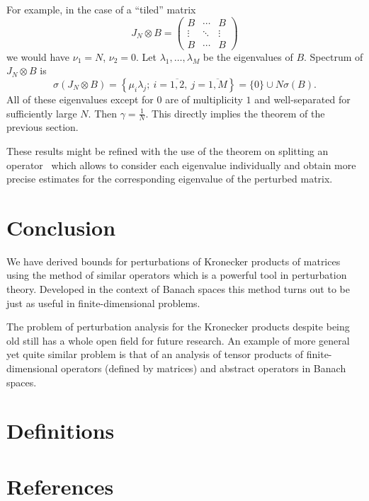 \documentclass[a4paper]{article}
\theoremstyle{definition}
\begin{document}
For example, in the case of a ``tiled'' matrix
\[
    J_N{\otimes}B =
    \begin{pmatrix}
        B & \cdots & B \\
        \vdots & \ddots & \vdots \\
        B & \cdots & B
    \end{pmatrix}
\]
    we would have
    \( \nu_1=N \),
    \( \nu_2=0 \).
Let \( \lambda_1,\ldots,\lambda_M \)
    be the eigenvalues of \( B \).
Spectrum of \( J_N{\otimes}B \) is
    \[
        \sigma(J_N{\otimes}B) = \left\{ \mu_i\lambda_j;\ i{=}\overline{1,2},\ j{=}\overline{1,M}\right\} = \{0\}\cup N\sigma(B).
    \]
All of these eigenvalues except for \( 0 \)
    are of multiplicity \( 1 \)
    and well-separated for sufficiently large \( N \).
Then \( \gamma=\frac1N \).
This directly implies the theorem of the previous section.

These results might be refined
    with the use of the theorem on splitting an operator~\cite{baskakov1987theorem}
    which allows to consider each eigenvalue individually
    and obtain more precise estimates for the corresponding
    eigenvalue of the perturbed matrix.
    

\section{Conclusion}

We have derived bounds
    for perturbations of Kronecker products
    of matrices using the method of similar operators
    which is a powerful tool in perturbation theory.
Developed in the context of Banach spaces
    this method turns out to be just as useful
    in finite-dimensional problems.

The problem of perturbation analysis for the Kronecker products
    despite being old still has a whole open field for future research.
An example of more general yet quite similar problem
    is that of an analysis of tensor products
    of finite-dimensional operators (defined by matrices)
    and abstract operators in Banach spaces.

\appendix
\section{Definitions}


\section{References}
\nocite{*}
\printbibliography
\end{document}
